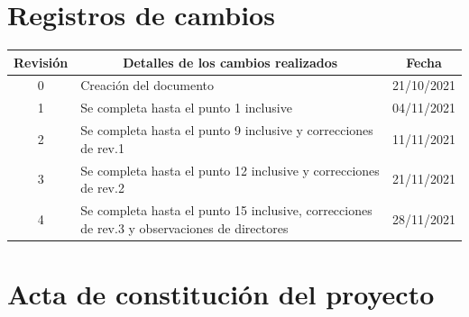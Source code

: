 \documentclass[
11pt, %
codirector, %
]{charter}
\begin{document}
\maketitle
\thispagestyle{empty}
\pagebreak


\thispagestyle{empty}
{\setlength{\parskip}{0pt}
\tableofcontents{}
}
\pagebreak


\section*{Registros de cambios}
\label{sec:registro}


\begin{table}[ht]
\label{tab:registro}
\centering
\begin{tabularx}{\linewidth}{@{}|c|X|c|@{}}
\hline
\rowcolor[HTML]{C0C0C0} 
Revisión & \multicolumn{1}{c|}{\cellcolor[HTML]{C0C0C0}Detalles de los cambios realizados} & Fecha      \\ \hline
0      & Creación del documento                                 & 21/10/2021 \\ \hline %
1      & Se completa hasta el punto 1 inclusive                 & 04/11/2021 \\ \hline
2      & Se completa hasta el punto 9 inclusive y correcciones de rev.1	& 11/11/2021 \\ \hline
3      & Se completa hasta el punto 12 inclusive y correcciones de rev.2	& 21/11/2021 \\ \hline
4      & Se completa hasta el punto 15 inclusive, correcciones de rev.3 y observaciones de directores	& 28/11/2021 \\ \hline
\end{tabularx}
\end{table}

\pagebreak



\section*{Acta de constitución del proyecto}
\label{sec:acta}
\end{document}
